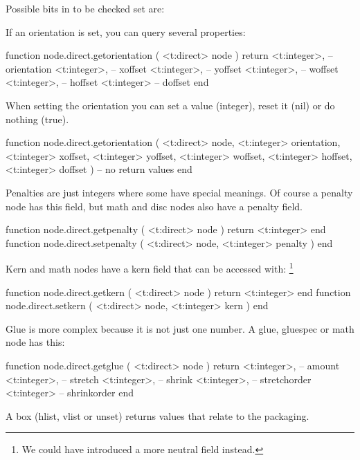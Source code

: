 Possible bits in to be checked set are:


If an orientation is set, you can query several properties:

\starttyping[option=LUA]
function node.direct.getorientation (
    <t:direct> node
)
    return
        <t:integer>, -- orientation
        <t:integer>, -- xoffset
        <t:integer>, -- yoffset
        <t:integer>, -- woffset
        <t:integer>, -- hoffset
        <t:integer>  -- doffset
end
\stoptyping

When setting the orientation you can set a value (integer),
reset it (nil) or do nothing (true).

\starttyping[option=LUA]
function node.direct.getorientation (
    <t:direct>  node,
    <t:integer> orientation,
    <t:integer> xoffset,
    <t:integer> yoffset,
    <t:integer> woffset,
    <t:integer> hoffset,
    <t:integer> doffset
)
    -- no return values
end
\stoptyping

\stopsubsection

\startsubsection[title={Kerns, glue and penalties}]

Penalties are just integers where some have special meanings. Of course a penalty
node has this field, but math and disc nodes also have a penalty field.

\starttyping[option=LUA]
function node.direct.getpenalty ( <t:direct> node ) return <t:integer> end
function node.direct.setpenalty ( <t:direct> node, <t:integer> penalty ) end
\stoptyping

Kern and math nodes have a kern field that can be accessed with: \footnote {We
could have introduced a more neutral  field instead.}

\starttyping[option=LUA]
function node.direct.getkern ( <t:direct> node ) return <t:integer> end
function node.direct.setkern ( <t:direct> node, <t:integer> kern ) end
\stoptyping

Glue is more complex because it is not just one number. A glue, gluespec or math
node has this:

\starttyping[option=LUA]
function node.direct.getglue ( <t:direct> node )
    return
        <t:integer>, -- amount
        <t:integer>, -- stretch
        <t:integer>, -- shrink
        <t:integer>, -- stretchorder
        <t:integer>  -- shrinkorder
end
\stoptyping

A box (hlist, vlist or unset) returns values that relate to the packaging.

